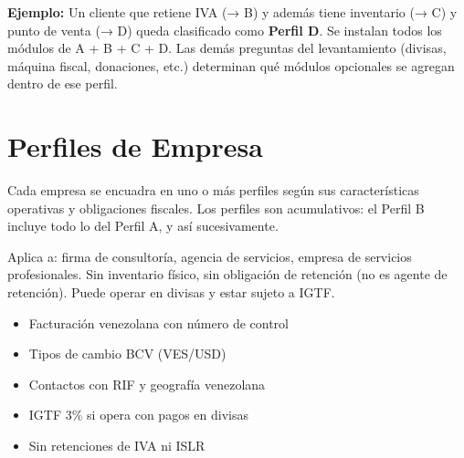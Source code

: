 \documentclass[11pt,a4paper]{article}
\begin{document}
\begin{Form}
\vspace{8pt}
\begin{tcolorbox}[colback=melocoton, colframe=naranja, boxrule=0.8pt, arc=3pt,
                  left=8pt, right=8pt, top=5pt, bottom=5pt]
\small\textbf{Ejemplo:} Un cliente que retiene IVA (→ B) y además tiene inventario (→ C) y punto de venta (→ D)
queda clasificado como \textbf{Perfil D}. Se instalan todos los módulos de A + B + C + D.
Las demás preguntas del levantamiento (divisas, máquina fiscal, donaciones, etc.)
determinan qué módulos opcionales se agregan dentro de ese perfil.
\end{tcolorbox}

\clearpage

\section{Perfiles de Empresa}

Cada empresa se encuadra en uno o más perfiles según sus características operativas y obligaciones fiscales. Los perfiles son acumulativos: el Perfil B incluye todo lo del Perfil A, y así sucesivamente.

\begin{tcolorbox}[perfilbox, title={Perfil A — Servicios, Contribuyente Ordinario}]
Aplica a: firma de consultoría, agencia de servicios, empresa de servicios profesionales. Sin inventario físico, sin obligación de retención (no es agente de retención). Puede operar en divisas y estar sujeto a IGTF.
\begin{itemize}[leftmargin=1.2em, itemsep=2pt]
  \item Facturación venezolana con número de control
  \item Tipos de cambio BCV (VES/USD)
  \item Contactos con RIF y geografía venezolana
  \item IGTF 3\% si opera con pagos en divisas
  \item Sin retenciones de IVA ni ISLR
\end{itemize}
\end{tcolorbox}

\vspace{6pt}


\end{Form}
\end{document}
